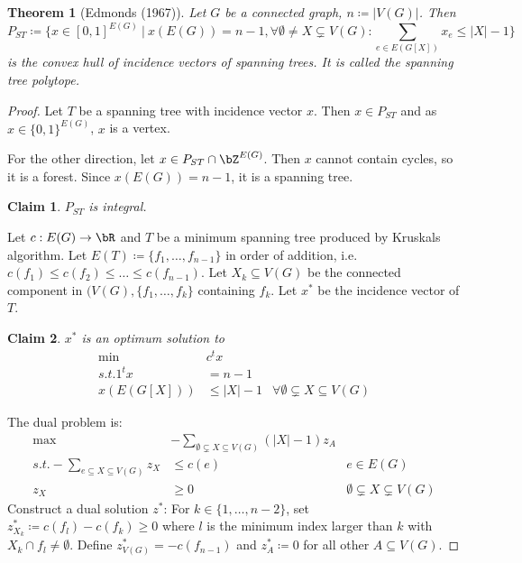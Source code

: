 \documentclass[11pt, a4paper]{article}
\newcommand{\abs}[1]{\left\lvert#1\right\rvert}
\newcommand{\set}[1]{\{#1\}}
\newtheorem{theorem}{Theorem}[section]
\newtheorem*{claim}{Claim}
\theoremstyle{remark}
\theoremstyle{definition}
\begin{document}
\begin{theorem}[Edmonds (1967)]
	Let $G$ be a connected graph, $n\coloneqq \abs{V(G)}$. Then
	\[P_{ST}\coloneqq \set{x\in [0,1]^{E(G)}\ |\ x(E(G))=n-1,\forall \emptyset\neq X\subsetneq V(G): \sum_{e\in E(G[X])}x_e\leq \abs{X}-1}\]
	is the convex hull of incidence vectors of spanning trees. It is
	called the spanning tree polytope.
\end{theorem}
\begin{proof}
	Let $T$ be a spanning tree with incidence vector $x$. Then $x\in P_{ST}$
	and as $x\in \set{0,1}^{E(G)}$, $x$ is a vertex.

	For the other direction, let $x\in P_{ST}\cap\bZ^{E(G)}$. Then $x$
	cannot contain cycles, so it is a forest. Since $x(E(G))=n-1$, it is
	a spanning tree.
	\begin{claim}
		$P_{ST}$ is integral.
	\end{claim}
	Let $c: E(G)\to\bR$ and $T$ be a minimum spanning tree produced by Kruskals
	algorithm. Let $E(T)\coloneqq \set{f_1,\ldots,f_{n-1}}$ in order of addition,
	i.e. $c(f_1)\leq c(f_2)\leq\ldots\leq c(f_{n-1})$. Let $X_k\subseteq V(G)$
	be the connected component in $(V(G),\set{f_1,\ldots,f_k}$ containing $f_k$.
	Let $x^*$ be the incidence vector of $T$.
	\begin{claim}
		$x^*$ is an optimum solution to
		\begin{align*}
			\min       & c^tx                                                         \\
			s.t. 1^tx  & =n-1                                                         \\
			x(E(G[X])) & \leq \abs{X}-1 & \forall \emptyset\subsetneq X\subseteq V(G)
		\end{align*}
	\end{claim}
	The dual problem is:
	\begin{align*}
		\max                                       & -\sum_{\emptyset\subsetneq X\subseteq V(G)}(\abs{X}-1)z_A                                        \\
		s.t. -\sum_{e\subseteq X\subseteq V(G)}z_X & \leq c(e)                                                 & e\in E(G)                            \\
		z_X                                        & \geq 0                                                    & \emptyset\subsetneq X\subsetneq V(G)
	\end{align*}
	Construct a dual solution $z^*$: For $k\in\set{1,\ldots,n-2}$, set
	$z^*_{X_k}\coloneqq c(f_l)-c(f_k)\geq0$ where $l$ is the minimum index larger
	than $k$ with $X_k\cap f_l\neq\emptyset$. Define $z^*_{V(G)}=-c(f_{n-1})$
	and $z^*_A\coloneqq 0$ for all other $A\subseteq V(G)$.


\end{proof}
\end{document}
